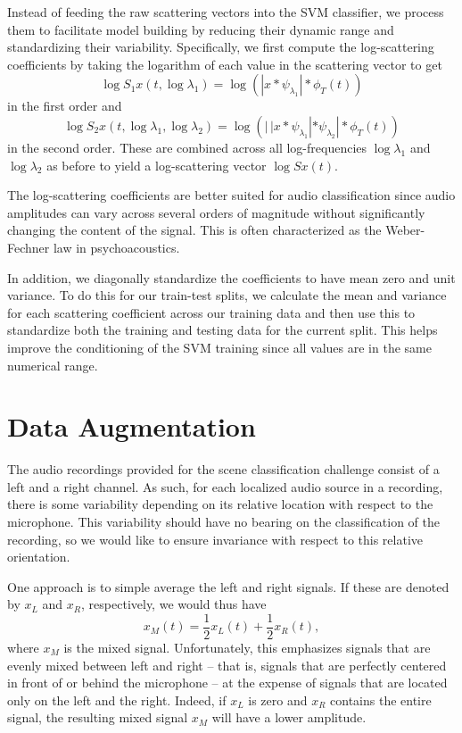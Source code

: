 \documentclass{article}
\newcommand{\lau}{{\lambda_1}}
\newcommand{\lad}{{\lambda_2}}
\begin{document}
\begin{sloppy}
Instead of feeding the raw scattering vectors into the SVM classifier, we process them to facilitate model building by reducing their dynamic range and standardizing their variability. Specifically, we first compute the log-scattering coefficients by taking the logarithm of each value in the scattering vector to get
\begin{equation}
	\log S_1 x(t, \log \lau) = \log \left( | x \ast \psi_\lau | \ast \phi_T(t) \right)
\end{equation}
in the first order and
\begin{equation}
	\log S_2 x(t, \log \lau, \log \lad) = \log \left( |\,| x \ast \psi_\lau | \ast \psi_\lad | \ast \phi_T(t) \right)
\end{equation}
in the second order. These are combined across all log-frequencies $\log \lau$ and $\log \lad$ as before to yield a log-scattering vector $\log Sx(t)$.

The log-scattering coefficients are better suited for audio classification since audio amplitudes can vary across several orders of magnitude without significantly changing the content of the signal. This is often characterized as the Weber-Fechner law in psychoacoustics.

In addition, we diagonally standardize the coefficients to have mean zero and unit variance. To do this for our train-test splits, we calculate the mean and variance for each scattering coefficient across our training data and then use this to standardize both the training and testing data for the current split. This helps improve the conditioning of the SVM training since all values are in the same numerical range.

\section{Data Augmentation}
\label{sec:augment}

The audio recordings provided for the scene classification challenge consist of a left and a right channel. As such, for each localized audio source in a recording, there is some variability depending on its relative location with respect to the microphone. This variability should have no bearing on the classification of the recording, so we would like to ensure invariance with respect to this relative orientation.

One approach is to simple average the left and right signals. If these are denoted by $x_L$ and $x_R$, respectively, we would thus have
\begin{equation}
	x_M(t) = \frac{1}{2} x_L(t) + \frac{1}{2} x_R(t),
\end{equation}
where $x_M$ is the mixed signal. Unfortunately, this emphasizes signals that are evenly mixed between left and right -- that is, signals that are perfectly centered in front of or behind the microphone -- at the expense of signals that are located only on the left and the right. Indeed, if $x_L$ is zero and $x_R$ contains the entire signal, the resulting mixed signal $x_M$ will have a lower amplitude.


\end{sloppy}
\end{document}
